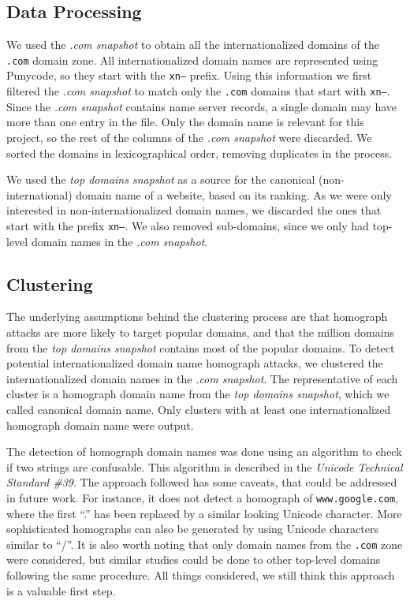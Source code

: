 \documentclass[letterpaper,twocolumn,10pt]{article}
\begin{document}
\subsection{Data Processing}
We used the \textit{.com snapshot} to obtain all the internationalized domains of the \texttt{.com} domain zone.
All internationalized domain names are represented using Punycode, so they start with the \texttt{xn--} prefix.
Using this information we first filtered the \textit{.com snapshot} to match only the \texttt{.com} domains that start with \texttt{xn--}.
Since the \textit{.com snapshot} contains name server records, a single domain may have more than one entry in the file.
Only the domain name is relevant for this project, so the rest of the columns of the \textit{.com snapshot} were discarded.
We sorted the domains in lexicographical order, removing duplicates in the process.

We used the \textit{top domains snapshot} as a source for the canonical (non-international) domain name of a website, based on its ranking.
As we were only interested in non-internationalized domain names, we discarded the ones that start with the prefix \texttt{xn--}.
We also removed sub-domains, since we only had top-level domain names in the \textit{.com snapshot}.

\subsection{Clustering}
The underlying assumptions behind the clustering process are that homograph attacks are more likely to target popular domains, and that the million domains from the \textit{top domains snapshot} contains most of the popular domains.
To detect potential internationalized domain name homograph attacks, we clustered the internationalized domain names in the \textit{.com snapshot}.
The representative of each cluster is a homograph domain name from the \textit{top domains snapshot}, which we called canonical domain name.
Only clusters with at least one internationalized homograph domain name were output.

The detection of homograph domain names was done using an algorithm to check if two strings are confusable.
This algorithm is described in the \textit{Unicode Technical Standard \#39}.
The approach followed has some caveats, that could be addressed in future work.
For instance, it does not detect a homograph of \texttt{www.google.com}, where the first ``.'' has been replaced by a similar looking Unicode character.
More sophisticated homographs can also be generated by using Unicode characters similar to ``/''.
It is also worth noting that only domain names from the \texttt{.com} zone were considered, but similar studies could be done to other top-level domains following the same procedure.
All things considered, we still think this approach is a valuable first step.
\end{document}
